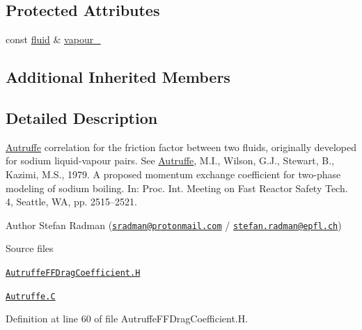 \subsection*{Protected Attributes}
\begin{DoxyCompactItemize}
\item 
const \hyperlink{classFoam_1_1fluid}{fluid} \& \hyperlink{classFoam_1_1FFDragCoefficientModels_1_1Autruffe_a2675e35060f71c22823e4a0b3c816dad}{vapour\+\_\+}
\end{DoxyCompactItemize}
\subsection*{Additional Inherited Members}


\subsection{Detailed Description}
\hyperlink{classFoam_1_1FFDragCoefficientModels_1_1Autruffe}{Autruffe} correlation for the friction factor between two fluids, originally developed for sodium liquid-\/vapour pairs. See \hyperlink{classFoam_1_1FFDragCoefficientModels_1_1Autruffe}{Autruffe}, M.\+I., Wilson, G.\+J., Stewart, B., Kazimi, M.\+S., 1979. A proposed momentum exchange coefficient for two-\/phase modeling of sodium boiling. In\+: Proc. Int. Meeting on Fast Reactor Safety Tech. 4, Seattle, WA, pp. 2515–2521. 

\label{_Description}%
 Author Stefan Radman (\href{mailto:sradman@protonmail.com}{\tt sradman@protonmail.\+com} / \href{mailto:stefan.radman@epfl.ch}{\tt stefan.\+radman@epfl.\+ch})

\begin{DoxyParagraph}{Source files}

\begin{DoxyItemize}
\item \href{../../../home/carlo/data/GeN-Foam/GeN-Foam_ffn/GeN-Foam/GeN-Foam/classes/thermalHydraulics/src/physicsModels/dragModels/FFDragCoefficientModels/Autruffe/AutruffeFFDragCoefficient.H}{\tt Autruffe\+F\+F\+Drag\+Coefficient.\+H} 
\item \href{../../../home/carlo/data/GeN-Foam/GeN-Foam_ffn/GeN-Foam/GeN-Foam/classes/thermalHydraulics/src/physicsModels/dragModels/FFDragCoefficientModels/Autruffe/Autruffe.C}{\tt Autruffe.\+C} 
\end{DoxyItemize}
\end{DoxyParagraph}


Definition at line 60 of file Autruffe\+F\+F\+Drag\+Coefficient.\+H.



